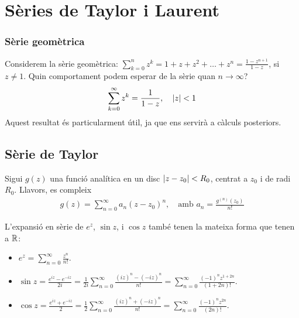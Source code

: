 \section{Sèries de Taylor i Laurent}
\subsubsection*{Sèrie geomètrica}
Considerem la sèrie geomètrica: $\displaystyle \sum_{k=0}^{n} z^{k} = 1 + z + z^{2} + \dots + z^{n} = \frac{1-z^{n+1}}{1-z}$, si $z \neq 1$. Quin comportament podem esperar de la sèrie quan $n \to \infty$?
\begin{align*}
    \sum_{k=0}^{\infty} z^{k} = \frac{1}{1 - z}, \quad \left| z \right| < 1
\end{align*}
Aquest resultat és particularment útil, ja que ens servirà a càlculs posteriors.

\subsection{Sèrie de Taylor}
\begin{thm}[de Taylor]
    Sigui $g(z)$ una funció analítica en un disc $\left| z-z_{0} \right| < R_{0}$, centrat a $z_{0}$ i de radi $R_{0}$. Llavors, es compleix
    \begin{align}
        g(z) = \sum_{n=0}^{\infty} a_{n} (z-z_{0})^{n}, \quad \text{amb } a_{n} = \frac{g^{(n)}(z_{0})}{n!}
    \end{align}
\end{thm}
L'expansió en sèrie de $e^{z}$, $\sin z$, i $\cos z$ també tenen la mateixa forma que tenen a $\mathbb{R}$:
\begin{itemize}
    \item $\displaystyle e^{z} = \sum_{n=0}^{\infty} \frac{z^{n}}{n!}$.
    \item $\displaystyle \sin z = \frac{e^{iz} - e^{-iz}}{2i} = \frac{1}{2i} \sum_{n=0}^{\infty} \frac{(iz)^{n} - (-iz)^{n}}{n!} = \sum_{n=0}^{\infty} \frac{(-1)^{n} z^{1+2n}}{(1+2n)!}$.
    \item $\displaystyle \cos z = \frac{e^{iz} + e^{-iz}}{2} = \frac{1}{2} \sum_{n=0}^{\infty} \frac{(iz)^{n} + (-iz)^{n}}{n!} = \sum_{n=0}^{\infty} \frac{(-1)^{n} z^{2n}}{(2n)!}$.
\end{itemize}

